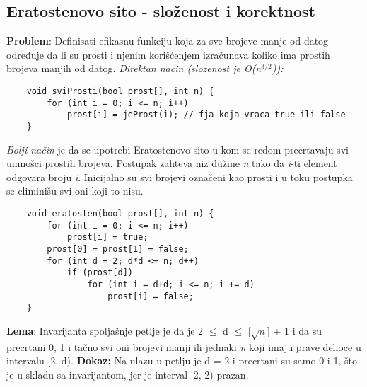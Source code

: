 \documentclass{article}
\begin{document}
\subsection{Eratostenovo sito - složenost i korektnost}
\textbf{Problem}: Definisati efikasnu funkciju koja za sve brojeve manje od datog
određuje da li su prosti i njenim korišćenjem izračunava koliko ima prostih
brojeva manjih od datog.
\newline \textit{Direktan nacin (slozenost je O(n$^{3/2}$)):}
\begin{lstlisting}
    void sviProsti(bool prost[], int n) {
        for (int i = 0; i <= n; i++)
            prost[i] = jeProst(i); // fja koja vraca true ili false
    }
\end{lstlisting}
\textit{Bolji način} je da se upotrebi Eratostenovo sito u kom se
redom precrtavaju svi umnošci prostih brojeva. Postupak zahteva niz dužine \textit{n} tako da \textit{i}-ti element
odgovara broju \textit{i}. Inicijalno su svi brojevi označeni kao prosti i u toku postupka
se eliminišu svi oni koji to nisu.
\begin{lstlisting}
    void eratosten(bool prost[], int n) { 
        for (int i = 0; i <= n; i++)
            prost[i] = true;
        prost[0] = prost[1] = false;
        for (int d = 2; d*d <= n; d++)
            if (prost[d])
                for (int i = d+d; i <= n; i += d)
                    prost[i] = false;
    }
\end{lstlisting}
\textbf{Lema}: Invarijanta spoljašnje petlje je da je 2 $\leq$ d $\leq$ [$\sqrt{n}$] + 1 i da su precrtani
0, 1 i tačno svi oni brojevi manji ili jednaki \textit{n} koji imaju prave delioce u intervalu
[2, d).
\newline \hspace*{0.4cm}\textbf{Dokaz:}
\newline \hspace*{0.8cm}Na ulazu u petlju je d = 2 i precrtani su samo 0 i 1, što je u skladu sa \hspace*{0.8cm}invarijantom, jer je interval [2, 2) prazan.
\end{document}
